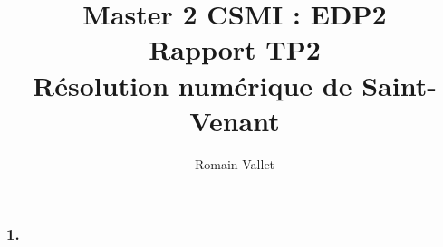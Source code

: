 \documentclass{article}
\title{Master 2 CSMI : EDP2\\Rapport TP2\\Résolution numérique de Saint-Venant}
\author{Romain Vallet}
\begin{document}
\maketitle

\subsubsection*{1.}
\end{document}
